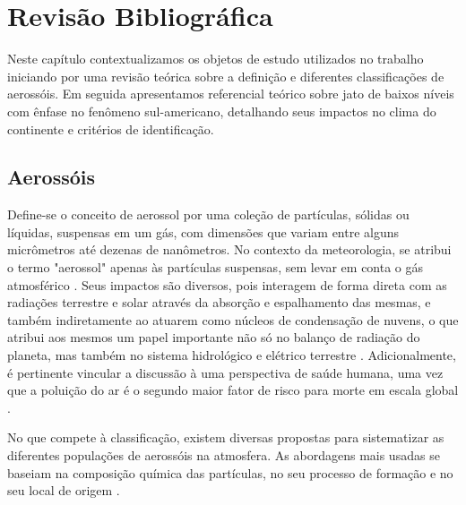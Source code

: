 \chapter{Revisão Bibliográfica}\label{cap:desenvolvimento}
	Neste capítulo contextualizamos os objetos de estudo utilizados no trabalho iniciando por uma revisão teórica sobre a definição e diferentes classificações de aerossóis. Em seguida apresentamos referencial teórico sobre jato de baixos níveis com ênfase no fenômeno sul-americano, detalhando seus impactos no clima do continente e critérios de identificação.
\section{Aerossóis}

	Define-se o conceito de aerossol por uma coleção de partículas, sólidas ou líquidas, suspensas em um gás, com dimensões que variam entre alguns micrômetros até dezenas de nanômetros. No contexto da meteorologia, se atribui o termo "aerossol" apenas às partículas suspensas, sem levar em conta o gás atmosférico \autocite{boucher2015,seinfeld2006}. Seus impactos são diversos, pois interagem de forma direta com as radiações terrestre e solar através da absorção e espalhamento das mesmas, e também indiretamente ao atuarem como núcleos de condensação de nuvens, o que atribui aos mesmos um papel importante não só no balanço de radiação do planeta, mas também no sistema hidrológico e elétrico terrestre \autocite{carslaw2022a}.  Adicionalmente, é pertinente vincular a discussão à uma perspectiva de saúde humana, uma vez que a poluição do ar é o segundo maior fator de risco para morte em escala global \autocite{stateofglobalair2025}.
	
	No que compete à classificação, existem diversas propostas para sistematizar as diferentes populações de aerossóis na atmosfera. As abordagens mais usadas se baseiam na composição química das partículas, no seu processo de formação e no seu local de origem \autocite{boucher2015}.
	

